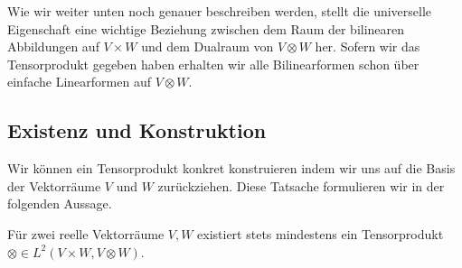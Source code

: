 \par
Wie wir weiter unten noch genauer beschreiben werden, stellt die universelle Eigenschaft eine wichtige Beziehung zwischen dem Raum der bilinearen Abbildungen auf \(V\times W\) und dem Dualraum von \(V\otimes W\) her. Sofern wir das Tensorprodukt gegeben haben erhalten wir alle Bilinearformen schon über einfache Linearformen auf \(V\otimes W\).


\subsection{Existenz und Konstruktion}
\label{\detokenize{vektoranalysis/tensor:existenz-und-konstruktion}}
\par
Wir können ein Tensorprodukt konkret konstruieren indem wir uns auf die Basis der Vektorräume \(V\) und \(W\) zurückziehen. Diese Tatsache formulieren wir in der folgenden Aussage.
\label{vektoranalysis/tensor:theorem-2}
\begin{theorem}{}{}



\par
Für zwei reelle Vektorräume \(V, W\) existiert stets mindestens ein Tensorprodukt \(\otimes\in L^2(V\times W, V\otimes W)\).
\end{theorem}

